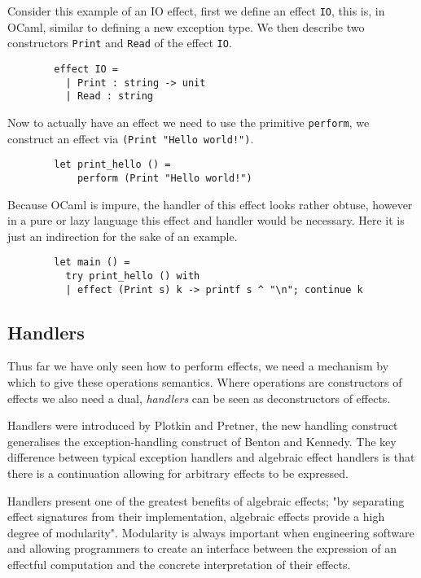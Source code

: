 \begin{example}
    Consider this example of an IO effect,
    first we define an effect \texttt{IO},
    this is, in OCaml, similar to defining
    a new exception type.
    We then describe two constructors
    \texttt{Print} and \texttt{Read}
    of the effect \texttt{IO}.
    \begin{verbatim}
        effect IO =
          | Print : string -> unit
          | Read : string\end{verbatim}
    Now to actually have an effect we need to use the primitive \texttt{perform},
    we construct an effect via \texttt{(Print "Hello world!")}.
    \begin{verbatim}
        let print_hello () =
            perform (Print "Hello world!")\end{verbatim}
    Because OCaml is impure, the handler of this effect looks rather obtuse,
    however in a pure or lazy language this effect and handler would be necessary.
    Here it is just an indirection for the sake of an example.
    \begin{verbatim}
        let main () =
          try print_hello () with
          | effect (Print s) k -> printf s ^ "\n"; continue k\end{verbatim}
\end{example}

\subsection{Handlers}
Thus far we have only seen how to perform effects,
we need a mechanism by which to give these operations semantics.
Where operations are constructors of effects we also need a dual,
\textit{handlers} can be seen as deconstructors of effects\cite{Plotkin:2002dw}.

Handlers were introduced by Plotkin and Pretner\cite{Plotkin:2009dr},
the new handling construct generalises the exception-handling
construct of Benton and Kennedy\cite{benton2001exceptional}.
The key difference between typical exception handlers
and algebraic effect handlers is that
there is a continuation allowing for arbitrary effects to be expressed.

Handlers present one of the greatest benefits of algebraic effects;
"by separating effect signatures from their implementation,
algebraic effects provide a high degree of modularity"\cite{kammar2013handlers}.
Modularity is always important when engineering software
and allowing programmers to create an interface between
the expression of an effectful computation
and the concrete interpretation of their effects.

